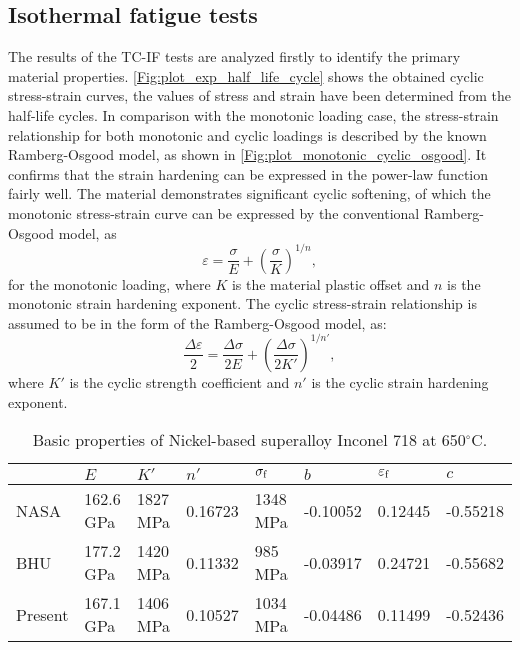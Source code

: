 \subsection{Isothermal fatigue tests}
\noindent
The results of the TC-IF tests are analyzed firstly to identify the primary material properties. \ref{Fig:plot_exp_half_life_cycle} shows the obtained cyclic stress-strain curves, the values of stress and strain have been determined from the half-life cycles. In comparison with the monotonic loading case, the stress-strain relationship for both monotonic and cyclic loadings is described by the known Ramberg-Osgood model, as shown in \ref{Fig:plot_monotonic_cyclic_osgood}. It confirms that the strain hardening can be expressed in the power-law function fairly well. The material demonstrates significant cyclic softening, of which the monotonic stress-strain curve can be expressed by the conventional Ramberg-Osgood model, as
\begin{equation}
{\varepsilon } = \frac{{\sigma }}{{E}} + {\left( {\frac{{\sigma }}{{K}}} \right)^{1/n}},
\end{equation}
for the monotonic loading, where $K$ is the material plastic offset and $n$ is the monotonic strain hardening exponent.
The cyclic stress-strain relationship is assumed to be in the form of the Ramberg-Osgood model, as:
\begin{equation}
\frac{{\Delta \varepsilon }}{2} = \frac{{\Delta \sigma }}{{2E}} + {\left( {\frac{{\Delta \sigma }}{{2K'}}} \right)^{1/n'}},
\end{equation}
where $K'$ is the cyclic strength coefficient and $n'$ is the cyclic strain hardening exponent.

\begin{table}[htbp]
  \centering
  \caption{Basic properties of Nickel-based superalloy Inconel 718 at 650$^{\circ}$C.}
    \begin{tabular}{llllllll}
    \hline
          & $E$     & $K'$     & $n'$     & $\sigma_{\rm f}$    & $b$     & $\varepsilon_{\rm f}$    & $c$ \\
    \hline
    NASA \cite{kim1988elevated, nelson1992creep}  & 162.6 GPa & 1827 MPa  & 0.16723 & 1348 MPa & -0.10052 & 0.12445 & -0.55218 \\
    BHU \cite{Mahobia2014}   & 177.2 GPa & 1420 MPa  & 0.11332 & 985 MPa & -0.03917 & 0.24721 & -0.55682 \\
    Present   & 167.1 GPa & 1406 MPa  & 0.10527 & 1034 MPa & -0.04486 & 0.11499 & -0.52436 \\
    \hline
    \end{tabular}
  \label{tab:MechanicalProperties}
\end{table}

